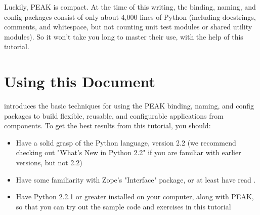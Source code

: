 Luckily, PEAK is compact. At the time of this writing, the binding,
naming, and config packages consist of only about 4,000 lines of Python
(including docstrings, comments, and whitespace, but not counting unit
test modules or shared utility modules). So it won't take you long to
master their use, with the help of this tutorial. 



\section{Using this Document}

 introduces
the basic techniques for using the PEAK binding, naming, and config
packages to build flexible, reusable, and configurable applications from
components. To get the best results from this tutorial, you should:

\begin{itemize}

\item Have a solid grasp of the Python language, version 2.2 (we
recommend checking out "What's New in Python 2.2" if you are familiar
with earlier versions, but not 2.2)

\item Have some familiarity with Zope's "Interface" package, or at least
have read .

\item Have Python 2.2.1 or greater installed on your computer, along
with PEAK, so that you can try out the sample code and exercises in this
tutorial

\end{itemize}

